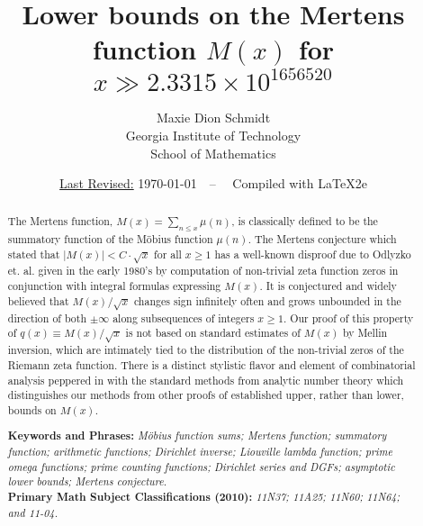 \documentclass[11pt,reqno,a4letter]{article}
\title{
       \LARGE{
       Lower bounds on the Mertens function $M(x)$ for $x \gg 2.3315 \times 10^{1656520}$ 
       } 
}
\author{{\large Maxie Dion Schmidt} \\ 
        {\small Georgia Institute of Technology} \\ 
        {\small School of Mathematics} 
}
\date{\small\underline{Last Revised:} \today\ \ -- \ \ Compiled with \LaTeX2e}
\numberwithin{figure}{section}
\numberwithin{table}{section}
\theoremstyle{plain}
\numberwithin{theorem}{section}
\theoremstyle{definition}
\begin{document}
 

\maketitle

\begin{abstract} 
The Mertens function, $M(x) = \sum_{n \leq x} \mu(n)$, is classically 
defined to be the summatory function of the M\"obius function 
$\mu(n)$. The 
Mertens conjecture which stated that $|M(x)| < C \cdot \sqrt{x}$ for all 
$x \geq 1$ has a well-known disproof due to Odlyzko et. al. given in the early 1980's by computation of 
non-trivial zeta function zeros in conjunction with integral formulas expressing $M(x)$. 
It is conjectured and widely believed that $M(x) / \sqrt{x}$ changes sign infinitely often and grows 
unbounded in the direction of both $\pm \infty$ along subsequences of integers $x \geq 1$. 
Our proof of this property of $q(x) \equiv M(x)/\sqrt{x}$ is not based on 
standard estimates of $M(x)$ by Mellin inversion, which are intimately tied to the distribution of the non-trivial 
zeros of the Riemann zeta function. 
There is a distinct stylistic 
flavor and element of combinatorial analysis 
peppered in with the standard methods from analytic number theory which distinguishes 
our methods from other proofs of established upper, rather than lower, bounds on $M(x)$. 

\bigskip 
\noindent
\textbf{Keywords and Phrases:} {\it M\"obius function sums; Mertens function; summatory function; 
                                    arithmetic functions; 
                                    Dirichlet inverse; Liouville lambda function; prime omega functions; 
                                    prime counting functions; Dirichlet series and DGFs; 
                                    asymptotic lower bounds; Mertens conjecture. } \\ 
\textbf{Primary Math Subject Classifications (2010):} {\it 11N37; 11A25; 11N60; 11N64; and 11-04. } 
\end{abstract} 
\end{document}
